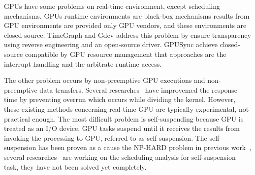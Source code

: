 GPUs have some problems on real-time environment, except  scheduling mechanisms.
GPUs runtime environments are black-box mechanisms results from GPU environments are provided only GPU vendors, and these environments are closed-source.
TimeGraph and Gdev address this problem by ensure transparency using reverse engineering and an open-source driver.
GPUSync achieve closed-source compatible by GPU resource management that approaches are the interrupt handling and the arbitrate runtime access.

The other problem occurs by non-preemptive GPU executions and non-preemptive data transfers.
Several researches~\cite{basaran:preemptive,sparc} have improvemed the response time by preventing overrun which occurs while dividing the kernel.
However, these existing methods concerning real-time GPU are typically experimental, not practical enough.
The most difficult problem is self-suspending because GPU is treated as an I/O device.
GPU tasks suspend until it receives the results from invoking the processing to GPU, referred to as self-suspension.
The self-suspension has been proven as a cause the NP-HARD problem in previous work~\cite{self-sus:1,self-sus:2},
several researches~\cite{chattopadhyay2014limited,kim2013segment} are working on the scheduling analysis for self-suspension task,
they have not been solved yet completely.

